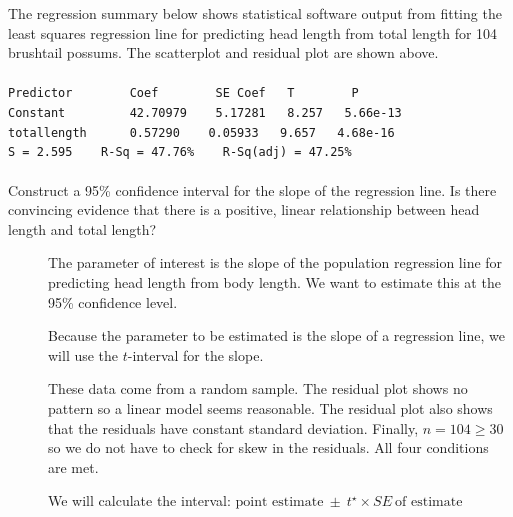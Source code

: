 \begin{examplewrap}
\begin{nexample}{


The regression summary below shows statistical software output from fitting the least squares regression line for predicting head length from total length for 104 brushtail possums.  The scatterplot and residual plot are shown above. 
\\
\\
\texttt{Predictor \ \ \ \ \ \ \ Coef \ \ \ \ \ \ \ SE Coef \ \ T \ \ \ \ \ \ \ P} \\
\texttt{Constant \ \ \ \ \ \ \ \  42.70979 \ \ \ 5.17281 \ \ 8.257 \ \ 5.66e-13} \\
\texttt{total\us{}length\ \ \ \ \ \ 0.57290 \ \ \ 0.05933 \ \ 9.657 \ \ 4.68e-16} \\

\texttt{S = 2.595\ \ \ \ R-Sq = 47.76\% \ \ \ R-Sq(adj) = 47.25\%}
\\
\\
Construct a 95\% confidence interval for the slope of the regression line.  Is there convincing evidence that there is a positive, linear relationship between head length and total length? %
}
\begin{description}
\item[] The parameter of interest is the slope of the population regression line for predicting head length from body length.  We want to estimate this at the 95\% confidence level.  
\item[] Because the parameter to be estimated is the slope of a regression line, we will use the $t$-interval for the slope.
\item[] These data come from a random sample.  The residual plot shows no pattern so a linear model seems reasonable.  The residual plot also shows that the residuals have constant standard deviation.  Finally, $n=104\ge 30$ so we do not have to check for skew in the residuals.  All four conditions are met.
\item[]  We will calculate the interval:
$\text{point estimate}\ \pm\ t^{\star} \times SE\ \text{of estimate}$


\end{description}
\end{nexample}
\end{examplewrap}

